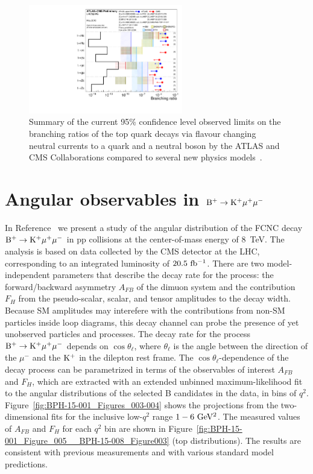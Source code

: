 \documentclass{PoS}
\begin{document}
\begin{figure}[htb]
\centering
\includegraphics[width=0.6\textwidth]{figures/fcnc_summarybsm_may18}
\caption{
  Summary of the current 95\% confidence level observed limits on the branching
  ratios of the top quark decays via flavour changing neutral currents to a
  quark and a neutral boson by the ATLAS and CMS Collaborations compared to
  several new physics models~\cite{cms-atlas-fcnc}.
}
\label{fig:fcnc_summarybsm_may18}
\end{figure}


\section{Angular observables in ${\rm B^+ \to K^+\mu^+\mu^-}$}

In Reference~\cite{bph-15-001} we present a study of the angular distribution of
the FCNC
decay ${\rm B^+ \to K^+\mu^+\mu^-}$ in pp collisions at the center-of-mass
energy of 8~TeV. The analysis is based on data collected by the CMS detector at
the LHC, corresponding to an integrated luminosity of ${\rm 20.5~fb^{-1}}$.
There are two model-independent parameters that describe the decay rate for the
process: the forward/backward asymmetry $A_{FB}$ of the dimuon system and the
contribution $F_H$ from the pseudo-scalar, scalar, and tensor amplitudes to the
decay width. Because SM amplitudes may interefere with the contributions from
non-SM particles inside loop diagrams, this decay channel can probe the presence
of yet unobserved particles and processes.
The decay rate for the process ${\rm B^+ \to K^+\mu^+\mu^-}$ depends on
$\cos\theta_{\ell}$, where $\theta_{\ell}$ is the angle between the direction
of the $\mu^-$ and the ${\rm K^+}$ in the dilepton rest frame. The
$\cos\theta_{\ell}$-dependence of the decay process can be parametrized in
terms of the observables of interest $A_{FB}$ and $F_H$, which are extracted
with an extended unbinned maximum-likelihood fit to the angular distributions
of the selected B candidates in the data, in bins of $q^2$.
Figure~\ref{fig:BPH-15-001_Figures_003-004} shows the projections from the
two-dimensional fits for the inclusive low-$q^2$ range ${\rm 1-6~GeV^2}$.
The measured values of $A_{FB}$ and $F_H$ for each $q^2$ bin are shown in
Figure~\ref{fig:BPH-15-001_Figure_005__BPH-15-008_Figure003}
(top distributions). The results are consistent with previous measurements and
with various standard model predictions.
\end{document}
